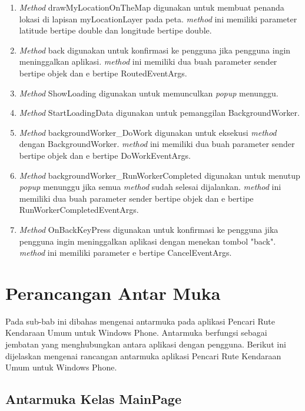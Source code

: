 \begin{enumerate}
	\item \textit{Method} drawMyLocationOnTheMap digunakan untuk membuat penanda lokasi di lapisan myLocationLayer pada peta. \textit{method} ini memiliki parameter latitude bertipe double dan longitude bertipe double.
	\item \textit{Method} back digunakan untuk konfirmasi ke pengguna jika pengguna ingin meninggalkan aplikasi. \textit{method} ini memiliki dua buah parameter sender bertipe objek dan e bertipe RoutedEventArgs.
	\item \textit{Method} ShowLoading digunakan untuk memunculkan \textit{popup} menunggu.
	\item \textit{Method} StartLoadingData digunakan untuk pemanggilan BackgroundWorker.
	\item \textit{Method} backgroundWorker\_DoWork digunakan untuk eksekusi \textit{method} dengan BackgroundWorker. \textit{method} ini memiliki dua buah parameter sender bertipe objek dan e bertipe DoWorkEventArgs.
	\item \textit{Method} backgroundWorker\_RunWorkerCompleted digunakan untuk menutup \textit{popup} menunggu jika semua \textit{method} sudah selesai dijalankan. \textit{method} ini memiliki dua buah parameter sender bertipe objek dan e bertipe RunWorkerCompletedEventArgs.
	\item \textit{Method} OnBackKeyPress digunakan untuk konfirmasi ke pengguna jika pengguna ingin meninggalkan aplikasi dengan menekan tombol "back". \textit{method} ini memiliki parameter e bertipe CancelEventArgs.
\end{enumerate}

\section{Perancangan Antar Muka}
\label{lab:Perancangan Kelas}
\hspace{0.5cm} Pada sub-bab ini dibahas mengenai antarmuka pada aplikasi Pencari Rute Kendaraan Umum untuk Windows Phone. Antarmuka berfungsi sebagai jembatan yang menghubungkan antara aplikasi dengan pengguna. Berikut ini dijelaskan mengenai rancangan antarmuka aplikasi Pencari Rute Kendaraan Umum untuk Windows Phone. 

\subsection{Antarmuka Kelas MainPage}
\label{lab:Antarmuka Kelas MainPage}

